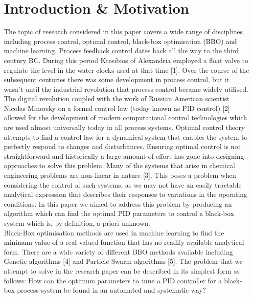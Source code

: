 \documentclass[conference]{IEEEtran}
\theoremstyle{definition}
\begin{document}
\section{Introduction \& Motivation}
\noindent The topic of research considered in this paper covers a wide range of disciplines including process control, optimal control, black-box optimisation (BBO) and machine learning. Process feedback control dates back all the way to the third century BC. During this period Ktesibios of Alexandria employed a float valve to regulate the level in the water clocks used at that time [1]. Over the course of the subsequent centuries there was some development in process control, but it wasn’t until the industrial revolution that process control became widely utilised. The digital revolution coupled with the work of Russian American scientist Nicolas Minorsky on a formal control law (today known as PID control) [2] allowed for the development of modern computational control technologies which are used almost universally today in all process systems. Optimal control theory attempts to find a control law for a dynamical system that enables the system to perfectly respond to changes and disturbances. Ensuring optimal control is not straightforward and historically a large amount of effort has gone into designing approaches to solve this problem. Many of the systems that arise in chemical engineering problems are non-linear in nature [3]. This poses a problem when considering the control of such systems, as we may not have an easily tractable analytical expression that describes their responses to variations in the operating conditions. In this paper we aimed to address this problem by producing an algorithm which can find the optimal PID parameters to control a black-box system which is, by definition, a priori unknown. \\
Black-Box optimisation methods are used in machine learning to find the minimum value of a real valued function that has no readily available analytical form. There are a wide variety of different BBO methods available including Genetic algorithms [4] and Particle Swarm algorithms [5]. The problem that we attempt to solve in the research paper can be described in its simplest form as follows: How can the optimum parameters to tune a PID controller for a black-box process system be found in an automated and systematic way? \\
\end{document}
